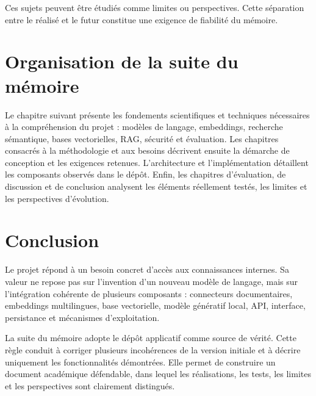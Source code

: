 Ces sujets peuvent être étudiés comme limites ou perspectives. Cette séparation entre le réalisé et le futur constitue une exigence de fiabilité du mémoire.

\section{Organisation de la suite du mémoire}

Le chapitre suivant présente les fondements scientifiques et techniques nécessaires à la compréhension du projet : modèles de langage, embeddings, recherche sémantique, bases vectorielles, RAG, sécurité et évaluation. Les chapitres consacrés à la méthodologie et aux besoins décrivent ensuite la démarche de conception et les exigences retenues. L'architecture et l'implémentation détaillent les composants observés dans le dépôt. Enfin, les chapitres d'évaluation, de discussion et de conclusion analysent les éléments réellement testés, les limites et les perspectives d'évolution.

\section{Conclusion}

Le projet répond à un besoin concret d'accès aux connaissances internes. Sa valeur ne repose pas sur l'invention d'un nouveau modèle de langage, mais sur l'intégration cohérente de plusieurs composants : connecteurs documentaires, embeddings multilingues, base vectorielle, modèle génératif local, API, interface, persistance et mécanismes d'exploitation.

La suite du mémoire adopte le dépôt applicatif comme source de vérité. Cette règle conduit à corriger plusieurs incohérences de la version initiale et à décrire uniquement les fonctionnalités démontrées. Elle permet de construire un document académique défendable, dans lequel les réalisations, les tests, les limites et les perspectives sont clairement distingués.
